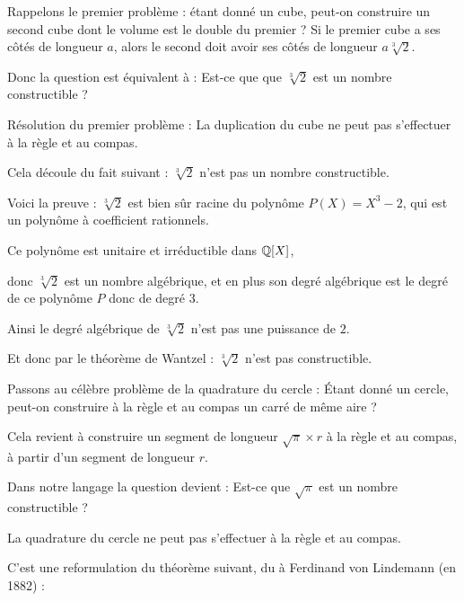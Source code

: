   
\diapo

Rappelons le premier problème : étant donné un cube, peut-on construire
un second cube dont le volume est le double du premier ?
Si le premier cube a ses côtés de longueur $a$, alors le second doit
avoir ses côtés de longueur $a\sqrt[3]{2}$.

Donc la question est équivalent à : 
Est-ce que que $\sqrt[3]{2}$ est un nombre constructible ?
 

\diapo

Résolution du premier problème : 
La duplication du cube ne peut pas s'effectuer à la règle et au compas.

\change
Cela découle du fait suivant :
$\sqrt[3]{2}$ n'est pas un nombre constructible.


\change
Voici la preuve : $\sqrt[3]{2}$ est bien sûr racine du polynôme $P(X)=X^3-2$, qui est un polynôme
à coefficient rationnels.

\change
Ce polynôme est unitaire et irréductible dans $\mathbb{Q}[X]$,

\change
donc $\sqrt[3]{2}$ est un nombre algébrique, et en plus son degré algébrique est le degré de ce polynôme $P$ 
donc de degré $3$.

\change
Ainsi le degré algébrique de $\sqrt[3]{2}$ n'est pas une puissance de $2$.

\change
Et donc par le théorème de
Wantzel : $\sqrt[3]{2}$ n'est pas constructible.


\diapo

Passons au célèbre problème de la quadrature du cercle :
\'Etant donné un cercle, 
peut-on construire à la règle et au compas 
un carré de même aire ?

Cela revient à construire un segment de longueur $\sqrt{\pi} \times r$ à la règle et au compas, à
partir d'un segment de longueur $r$.

Dans notre langage la question devient : 
Est-ce que $\sqrt\pi$ est un nombre constructible ?



\diapo

La quadrature du cercle ne peut pas s'effectuer à la règle et au compas.


\change
C'est une reformulation du théorème suivant, 
du à Ferdinand von Lindemann (en 1882) :

